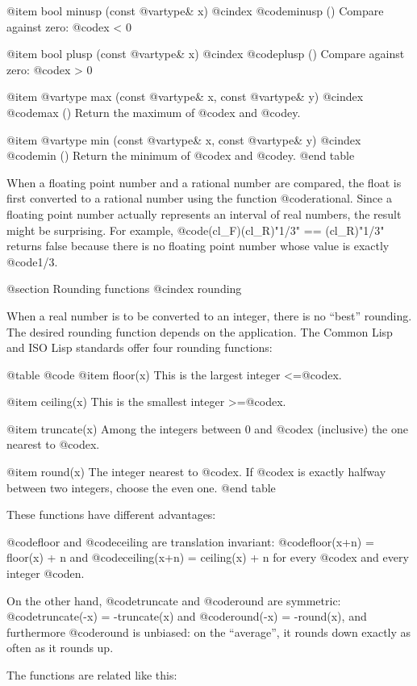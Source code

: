 @item bool minusp (const @var{type}& x)
@cindex @code{minusp ()}
Compare against zero: @code{x < 0}

@item bool plusp (const @var{type}& x)
@cindex @code{plusp ()}
Compare against zero: @code{x > 0}

@item @var{type} max (const @var{type}& x, const @var{type}& y)
@cindex @code{max ()}
Return the maximum of @code{x} and @code{y}.

@item @var{type} min (const @var{type}& x, const @var{type}& y)
@cindex @code{min ()}
Return the minimum of @code{x} and @code{y}.
@end table

When a floating point number and a rational number are compared, the float
is first converted to a rational number using the function @code{rational}.
Since a floating point number actually represents an interval of real numbers,
the result might be surprising.
For example, @code{(cl_F)(cl_R)"1/3" == (cl_R)"1/3"} returns false because
there is no floating point number whose value is exactly @code{1/3}.


@section Rounding functions
@cindex rounding

When a real number is to be converted to an integer, there is no ``best''
rounding. The desired rounding function depends on the application.
The Common Lisp and ISO Lisp standards offer four rounding functions:

@table @code
@item floor(x)
This is the largest integer <=@code{x}.

@item ceiling(x)
This is the smallest integer >=@code{x}.

@item truncate(x)
Among the integers between 0 and @code{x} (inclusive) the one nearest to @code{x}.

@item round(x)
The integer nearest to @code{x}. If @code{x} is exactly halfway between two
integers, choose the even one.
@end table

These functions have different advantages:

@code{floor} and @code{ceiling} are translation invariant:
@code{floor(x+n) = floor(x) + n} and @code{ceiling(x+n) = ceiling(x) + n}
for every @code{x} and every integer @code{n}.

On the other hand, @code{truncate} and @code{round} are symmetric:
@code{truncate(-x) = -truncate(x)} and @code{round(-x) = -round(x)},
and furthermore @code{round} is unbiased: on the ``average'', it rounds
down exactly as often as it rounds up.

The functions are related like this:

